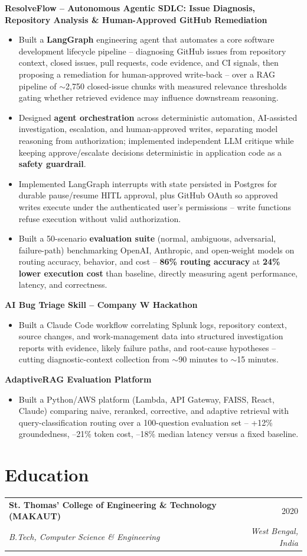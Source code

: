 \documentclass[10.5pt,letterpaper]{article}
\makeatletter
\newcommand{\resumeItem}[1]{\item\small{#1}}
\newcommand{\resumeSubheading}[4]{
  \vspace{4pt}\noindent
  \begin{tabular*}{\textwidth}{l@{\extracolsep{\fill}}r}
    \textbf{#1} & #2 \\
    \textit{\small #3} & \textit{\small #4} \\
  \end{tabular*}\vspace{-2pt}
}
\newcommand{\resumeProject}[2]{
  \vspace{4pt}\noindent
  \textbf{#1} \hfill \textit{\small #2}\vspace{1pt}
}
\makeatother
\begin{document}
\resumeProject{ResolveFlow -- Autonomous Agentic SDLC: Issue Diagnosis, Repository Analysis \& Human-Approved GitHub Remediation}{}
\begin{itemize}
    \resumeItem{Built a \textbf{LangGraph} engineering agent that automates a core software development lifecycle pipeline -- diagnosing GitHub issues from repository context, closed issues, pull requests, code evidence, and CI signals, then proposing a remediation for human-approved write-back -- over a RAG pipeline of $\sim$2,750 closed-issue chunks with measured relevance thresholds gating whether retrieved evidence may influence downstream reasoning.}
    \resumeItem{Designed \textbf{agent orchestration} across deterministic automation, AI-assisted investigation, escalation, and human-approved writes, separating model reasoning from authorization; implemented independent LLM critique while keeping approve/escalate decisions deterministic in application code as a \textbf{safety guardrail}.}
    \resumeItem{Implemented LangGraph interrupts with state persisted in Postgres for durable pause/resume HITL approval, plus GitHub OAuth so approved writes execute under the authenticated user's permissions -- write functions refuse execution without valid authorization.}
    \resumeItem{Built a 50-scenario \textbf{evaluation suite} (normal, ambiguous, adversarial, failure-path) benchmarking OpenAI, Anthropic, and open-weight models on routing accuracy, behavior, and cost -- \textbf{86\% routing accuracy} at \textbf{24\% lower execution cost} than baseline, directly measuring agent performance, latency, and correctness.}
\end{itemize}

\resumeProject{AI Bug Triage Skill -- Company W Hackathon}{}
\begin{itemize}
    \resumeItem{Built a Claude Code workflow correlating Splunk logs, repository context, source changes, and work-management data into structured investigation reports with evidence, likely failure paths, and root-cause hypotheses -- cutting diagnostic-context collection from $\sim$90 minutes to $\sim$15 minutes.}
\end{itemize}

\resumeProject{AdaptiveRAG Evaluation Platform}{}
\begin{itemize}
    \resumeItem{Built a Python/AWS platform (Lambda, API Gateway, FAISS, React, Claude) comparing naive, reranked, corrective, and adaptive retrieval with query-classification routing over a 100-question evaluation set -- +12\% groundedness, --21\% token cost, --18\% median latency versus a fixed baseline.}
\end{itemize}

\section*{Education}
\resumeSubheading{St. Thomas' College of Engineering \& Technology (MAKAUT)}{2020}{B.Tech, Computer Science \& Engineering}{West Bengal, India}
\end{document}
